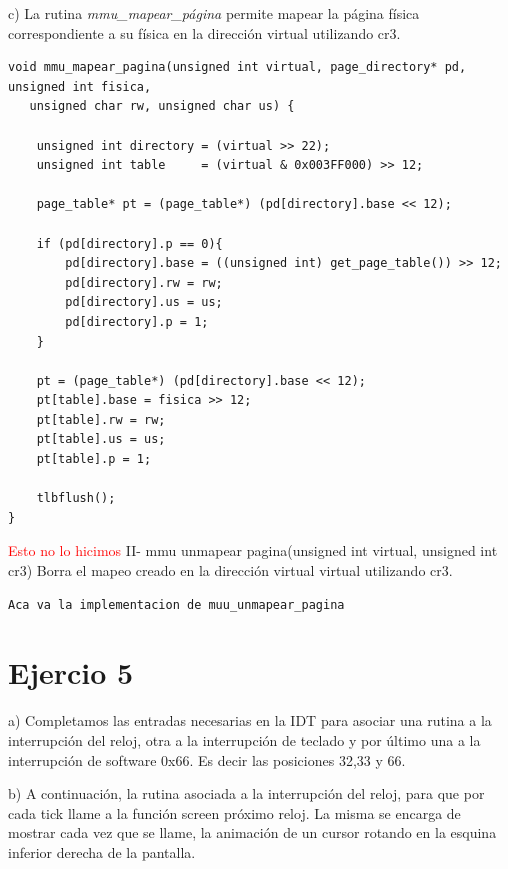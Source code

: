 \documentclass[a4paper]{article}
\begin{document}
{\large c)} La rutina \textit{mmu_mapear_p\'agina} permite mapear la p\'agina f\'isica correspondiente a su f\'isica en la direcci\'on virtual utilizando cr3.

\begin{codesnippet}
\begin{verbatim}
void mmu_mapear_pagina(unsigned int virtual, page_directory* pd, unsigned int fisica, 
   unsigned char rw, unsigned char us) {

    unsigned int directory = (virtual >> 22);
    unsigned int table     = (virtual & 0x003FF000) >> 12;

    page_table* pt = (page_table*) (pd[directory].base << 12);

    if (pd[directory].p == 0){
        pd[directory].base = ((unsigned int) get_page_table()) >> 12;
        pd[directory].rw = rw;
	    pd[directory].us = us;
        pd[directory].p = 1;
    }

    pt = (page_table*) (pd[directory].base << 12);
    pt[table].base = fisica >> 12;
    pt[table].rw = rw;
    pt[table].us = us;
    pt[table].p = 1;

    tlbflush();
}
\end{verbatim}
\end{codesnippet}


\textcolor{red}{Esto no lo hicimos}
II- mmu unmapear pagina(unsigned int virtual, unsigned int cr3)
Borra el mapeo creado en la direcci\'on virtual virtual utilizando cr3. \\


\begin{codesnippet}
\begin{verbatim}
Aca va la implementacion de muu_unmapear_pagina
\end{verbatim}
\end{codesnippet}

\newpage
\section{Ejercio 5}

{\large a)} Completamos las entradas necesarias en la IDT para asociar una rutina a la interrupci\'on del
reloj, otra a la interrupci\'on de teclado y por \'ultimo una a la interrupci\'on de software 0x66. Es decir las posiciones 32,33 y 66.


{\large b)} A continuación, la rutina asociada a la interrupci\'on del reloj, para que por cada tick llame a la
funci\'on screen pr\'oximo reloj. La misma se encarga de mostrar cada vez que se llame, la
animaci\'on de un cursor rotando en la esquina inferior derecha de la pantalla. 
\end{document}
